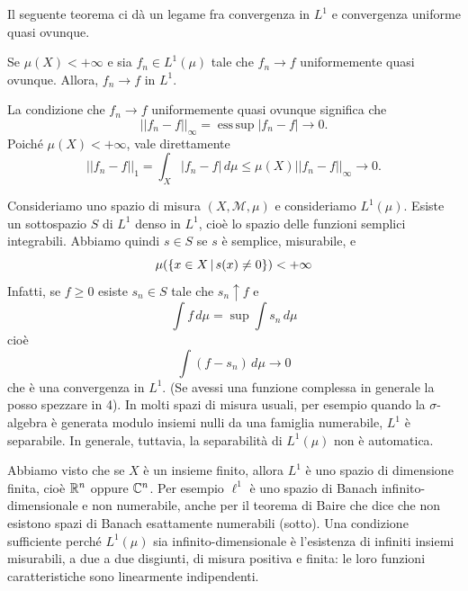 \documentclass[a4paper]{article}
\begin{document}
\begin{radioactive}
Il seguente teorema ci dà un legame fra convergenza in \(L^1\)
e convergenza uniforme quasi ovunque.
\end{radioactive}

\begin{radioactive}
\begin{snippettheorem}{}
    Se \(\mu(X) < +\infty\) e sia
    \(f_n \in L^1(\mu)\) tale che \(f_n \to f\)
    uniformemente quasi ovunque. Allora, \(f_n \to f\) in \(L^1\).
\end{snippettheorem}
\end{radioactive}

\begin{radioactive}
\begin{snippetproof}{}
    La condizione che \(f_n \to f\) uniformemente quasi ovunque significa che
    \[
        ||f_n-f||_\infty=\operatorname{ess\,sup}|f_n-f| \to 0.
    \]
    Poiché \(\mu(X)<+\infty\), vale direttamente
    \[
        ||f_n-f||_1
        =\int_X|f_n-f|\,d\mu
        \leq \mu(X)||f_n-f||_\infty \to 0.
    \]
\end{snippetproof}
\end{radioactive}

\begin{radioactive}
Consideriamo uno spazio di misura \((X, \mathcal M, \mu)\)
e consideriamo \(L^1(\mu)\).
Esiste un sottospazio \(S\) di \(L^1\) denso in \(L^1\),
cioè lo spazio delle funzioni semplici integrabili.
Abbiamo quindi \(s \in S\)
se \(s\) è semplice, misurabile, e \[
    \mu(\{x \in X \,|\, s(x) \neq 0\}) < +\infty
\]
Infatti, se \(f \geq 0\) esiste \(s_n \in S\) tale che
\(s_n \uparrow f\) e \[
    \int f\,d\mu = \sup \int s_n\,d\mu
\]
cioè \[
    \int(f-s_n)\,d\mu \to 0
\]
che è una convergenza in \(L^1\).
(Se avessi una funzione complessa in generale la posso spezzare in 4).
In molti spazi di misura usuali, per esempio quando la \(\sigma\)-algebra è generata modulo insiemi nulli da una famiglia numerabile, \(L^1\) è separabile. In generale, tuttavia, la separabilità di \(L^1(\mu)\) non è automatica.
\end{radioactive}

\begin{radioactive}
Abbiamo visto che se \(X\) è un insieme finito,
allora \(L^1\) è uno spazio di dimensione finita, cioè \(\mathbb{R}^n\)
oppure \(\mathbb{C}^n\).
Per esempio \(\ell^1\) è uno spazio di Banach infinito-dimensionale e non numerabile, anche per il teorema di Baire
che dice che non esistono spazi di Banach esattamente numerabili (sotto).
Una condizione sufficiente perché \(L^1(\mu)\) sia infinito-dimensionale è l'esistenza di infiniti insiemi misurabili, a due a due disgiunti, di misura positiva e finita: le loro funzioni caratteristiche sono linearmente indipendenti.
\end{radioactive}
\end{document}
